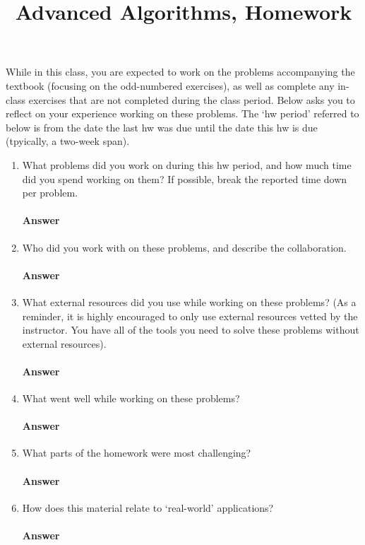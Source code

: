 \documentclass{article}
\title{Advanced Algorithms, Homework \hwnum}
\author{\todo{Put Your Name Here}}
\begin{document}
\maketitle

While in this class, you are expected to work on the problems accompanying the
textbook (focusing on the odd-numbered exercises),
as well as complete any in-class exercises that are not completed
during the class period.
Below asks you to reflect on your experience working on these problems. The
`hw period' referred to below is from the date the last hw was due until the date
this hw is due (tpyically, a two-week span).

\begin{enumerate}
    \item What problems did you work on during this hw period, and how much time
        did you spend working on them?  If possible, break the reported time down per
        problem.

        \paragraph{Answer}

    \item Who did you work with on these problems, and describe the collaboration.

        \paragraph{Answer}

    \item What external resources did you use while working on these problems?
        (As a reminder, it is highly encouraged to only use external resources
        vetted by the instructor. You have all of the tools you need to solve
        these problems without external resources).

        \paragraph{Answer}

    \item What went well while working on these problems?

        \paragraph{Answer}

    \item What parts of the homework were most challenging?

        \paragraph{Answer}

    \item How does this material relate to `real-world' applications?

        \paragraph{Answer}
\end{enumerate}
\end{document}
